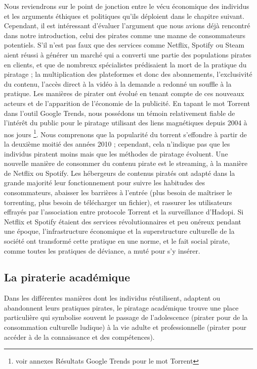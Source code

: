 Nous reviendrons sur le point de jonction entre le vécu économique des individus et les arguments éthiques et politiques qu'ils déploient dans le chapitre suivant. Cependant, il est intéressant d'évaluer l'argument que nous avions déjà rencontré dans notre introduction, celui des pirates comme une manne de consommateurs potentiels. S'il n'est pas faux que des services comme Netflix, Spotify ou Steam aient réussi à générer un marché qui a converti une partie des populations pirates en clients, et que de nombreux spécialistes prédisaient la mort de la pratique du piratage ; la multiplication des plateformes et donc des abonnements, l'exclusivité du contenu, l'accès direct à la vidéo à la demande a redonné un souffle à la pratique. Les manières de pirater ont évolué en tenant compte de ces nouveaux acteurs et de l'apparition de l'économie de la publicité. En tapant le mot \og Torrent \fg dans l'outil Google Trends, nous possédons un témoin relativement fiable de l'intérêt du public pour le piratage utilisant des liens magnétiques depuis 2004 à nos jours \footnote{voir annexes Résultats Google Trends pour le mot Torrent}. Nous comprenons que la popularité du torrent s'effondre à partir de la deuxième moitié des années 2010 ; cependant, cela n'indique pas que les individus piratent moins mais que les méthodes de piratage évoluent. Une nouvelle manière de consommer du contenu pirate est le streaming, à la manière de Netflix ou Spotify. Les hébergeurs de contenus piratés ont adapté dans la grande majorité leur fonctionnement pour suivre les habitudes des consommateurs, abaisser les barrières à l'entrée (plus besoin de maîtriser le torrenting, plus besoin de télécharger un fichier), et rassurer les utilisateurs effrayés par l'association entre protocole Torrent et la surveillance d'Hadopi. Si Netflix et Spotify étaient des services révolutionnaires et peu onéreux pendant une époque, l'infrastructure économique et la superstructure culturelle de la société ont transformé cette pratique en une norme, et le fait social pirate, comme toutes les pratiques de déviance, a muté pour s'y insérer. 

\subsection*{La piraterie académique}

Dans les différentes manières dont les individus réutilisent, adaptent ou abandonnent leurs pratiques pirates, le piratage académique trouve une place particulière qui symbolise souvent le passage de l'adolescence (pirater pour de la consommation culturelle ludique) à la vie adulte et professionnelle (pirater pour accéder à de la connaissance et des compétences).

